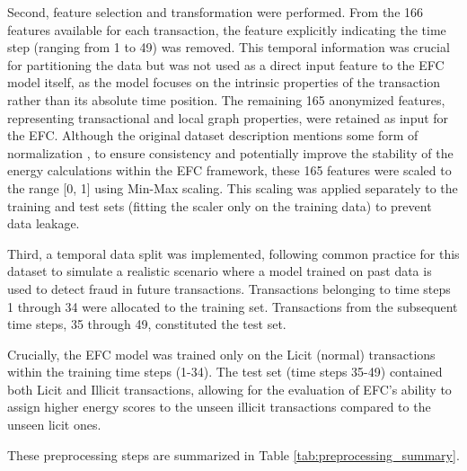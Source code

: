 \documentclass[12pt]{article}
\begin{document}
Second, feature selection and transformation were performed. From the 166 features available for each transaction, the
feature explicitly indicating the time step (ranging from 1 to 49) was removed. This temporal information was crucial
for partitioning the data but was not used as a direct input feature to the EFC model itself, as the model focuses on the
intrinsic properties of the transaction rather than its absolute time position. The remaining 165 anonymized features,
representing transactional and local graph properties, were retained as input for the EFC. Although the original dataset
description mentions some form of normalization \cite{weber2019antimoneylaunderingbitcoinexperimenting}, to ensure consistency
and potentially improve the stability of the energy calculations within the EFC framework, these 165 features were scaled
to the range [0, 1] using Min-Max scaling. This scaling was applied separately to the training and test sets (fitting
the scaler only on the training data) to prevent data leakage.

Third, a temporal data split was implemented, following common practice for this dataset
\cite{weber2019antimoneylaunderingbitcoinexperimenting, lorenz2021machinelearningmethodsdetect} to simulate a realistic
scenario where a model trained on past data is used to detect fraud in future transactions. Transactions belonging to
time steps 1 through 34 were allocated to the training set. Transactions from the subsequent time steps, 35 through 49,
constituted the test set.

Crucially, the EFC model was trained only on the Licit (normal) transactions within the training time steps (1-34).
The test set (time steps 35-49) contained both Licit and Illicit transactions, allowing for the evaluation of EFC's
ability to assign higher energy scores to the unseen illicit transactions compared to the unseen licit ones.

These preprocessing steps are summarized in Table \ref{tab:preprocessing_summary}.
\end{document}
